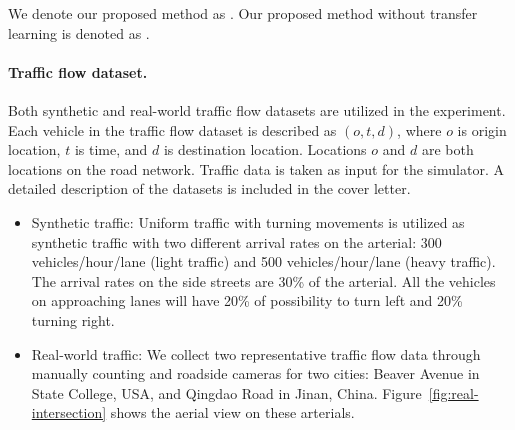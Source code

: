 We denote our proposed method as \textbf{\MTDeeplight}. Our proposed method without transfer learning is denoted as \textbf{\MDeeplight}.  


\paragraph{Traffic flow dataset.}
Both synthetic and real-world traffic flow datasets are utilized in the experiment. Each vehicle in the traffic flow dataset is described as $(o,t,d)$, where $o$ is origin location, $t$ is time, and $d$ is destination location. Locations $o$ and $d$ are both locations on the road network. Traffic data is taken as input for the simulator. A detailed description of the datasets is included in the cover letter.
\begin{itemize}[wide,noitemsep,topsep=0pt]

\item Synthetic traffic:  Uniform traffic with turning movements is utilized as synthetic traffic with two different arrival rates on the arterial: 300 vehicles/hour/lane (light traffic) and 500 vehicles/hour/lane (heavy traffic). The arrival rates on the side streets are 30\% of the arterial. All the vehicles on approaching lanes will have 20\% of possibility to turn left and 20\% turning right.

\item Real-world traffic: We collect two representative traffic flow data through manually counting and roadside cameras for two cities: Beaver Avenue in State College, USA, and Qingdao Road in Jinan, China. Figure~\ref{fig:real-intersection} shows the aerial view on these arterials.
\end{itemize}


